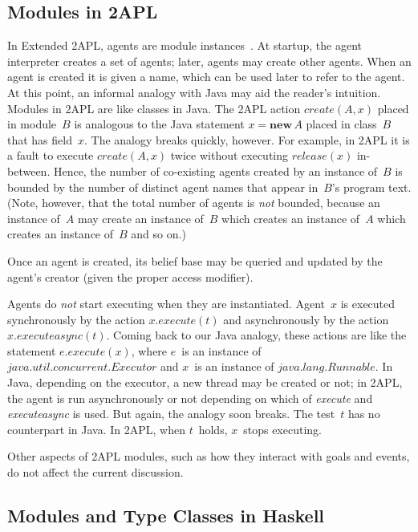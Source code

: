 \documentclass[conference,compsoc]{IEEEtran} %
\begin{document}
\subsection{Modules in 2APL} %

In Extended 2APL, agents are module
instances~\cite{DBLP:conf/prima/DastaniMS08}. At startup, the agent
interpreter creates a set of agents; later, agents may create other agents.
When an agent is created it is given a name, which can be used later to
refer to the agent. At this point, an informal analogy with Java may aid
the reader's intuition. Modules in 2APL are like classes in Java. The 2APL
action $\mathit{create}(A,x)$ placed in module~$B$ is analogous to the Java
statement $x=\mathbf{new}\,A$ placed in class~$B$ that has field~$x$.  The
analogy breaks quickly, however. For example, in 2APL it is a fault to
execute $\mathit{create}(A,x)$ twice without executing
$\mathit{release}(x)$ in-between. Hence, the number of co-existing agents
created by an instance of~$B$ is bounded by the number of distinct agent
names that appear in~$B$'s program text. (Note, however, that the total
number of agents is \emph{not} bounded, because an instance of~$A$ may
create an instance of~$B$ which creates an instance of~$A$ which creates an
instance of~$B$ and so on.)

Once an agent is created, its belief base may be queried and updated by the
agent's creator (given the proper access modifier).

Agents do \emph{not} start executing when they are instantiated. Agent~$x$
is executed synchronously by the action $x.\mathit{execute}(t)$ and
asynchronously by the action $x.\mathit{executeasync}(t)$. Coming back to
our Java analogy, these actions are like the statement
$e.\mathit{execute}(x)$, where $e$~is an instance of
$\mathit{java}.\mathit{util}.\mathit{concurrent}.\mathit{Executor}$ and
$x$~is an instance of $\mathit{java}.\mathit{lang}.\mathit{Runnable}$.  In
Java, depending on the executor, a new thread may be created or not; in
2APL, the agent is run asynchronously or not depending on which of
\textit{execute} and \textit{executeasync} is used. But again, the analogy
soon breaks. The test~$t$ has no counterpart in Java. In 2APL, when
$t$~holds, $x$~stops executing.

Other aspects of 2APL modules, such as how they interact with goals and
events, do not affect the current discussion.

\subsection{Modules and Type Classes in Haskell} %
\end{document}
